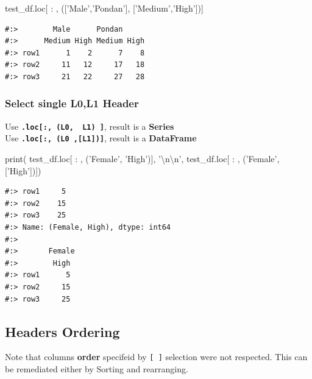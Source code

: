 \documentclass[
]{book}
\newenvironment{Shaded}{\begin{snugshade}}{\end{snugshade}}
\newcommand{\BuiltInTok}[1]{#1}
\newcommand{\CharTok}[1]{\textcolor[rgb]{0.5,0.5,0.5}{#1}}
\newcommand{\NormalTok}[1]{#1}
\newcommand{\StringTok}[1]{\textcolor[rgb]{0.5,0.5,0.5}{#1}}
\begin{document}
\begin{Shaded}
\begin{Highlighting}[]
\NormalTok{test_df.loc[ : , ([}\StringTok{'Male'}\NormalTok{,}\StringTok{'Pondan'}\NormalTok{], [}\StringTok{'Medium'}\NormalTok{,}\StringTok{'High'}\NormalTok{])]}
\end{Highlighting}
\end{Shaded}

\begin{verbatim}
#:>        Male      Pondan     
#:>      Medium High Medium High
#:> row1      1    2      7    8
#:> row2     11   12     17   18
#:> row3     21   22     27   28
\end{verbatim}

\hypertarget{select-single-l0l1-header}{%
\subsubsection{Select single L0,L1 Header}\label{select-single-l0l1-header}}

Use \textbf{\texttt{.loc{[}:,\ (L0,\ \ L1)\ {]}}}, result is a \textbf{Series}\\
Use \textbf{\texttt{.loc{[}:,\ (L0\ ,{[}L1{]}){]}}}, result is a \textbf{DataFrame}

\begin{Shaded}
\begin{Highlighting}[]
\BuiltInTok{print}\NormalTok{( test_df.loc[ : , (}\StringTok{'Female'}\NormalTok{, }\StringTok{'High'}\NormalTok{)], }\StringTok{'}\CharTok{\textbackslash{}n\textbackslash{}n}\StringTok{'}\NormalTok{,}
\NormalTok{       test_df.loc[ : , (}\StringTok{'Female'}\NormalTok{, [}\StringTok{'High'}\NormalTok{])])}
\end{Highlighting}
\end{Shaded}

\begin{verbatim}
#:> row1     5
#:> row2    15
#:> row3    25
#:> Name: (Female, High), dtype: int64 
#:> 
#:>       Female
#:>        High
#:> row1      5
#:> row2     15
#:> row3     25
\end{verbatim}

\hypertarget{headers-ordering}{%
\subsection{Headers Ordering}\label{headers-ordering}}

Note that columns \textbf{order} specifeid by \texttt{{[}\ {]}} selection were not respected. This can be remediated either by Sorting and rearranging.
\end{document}
